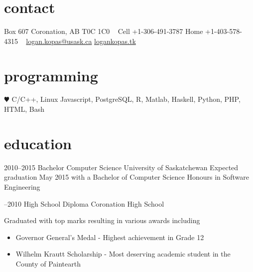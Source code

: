 \documentclass[print]{friggeri-cv} %
\begin{document}

\begin{aside}
\section{contact}
Box 607
Coronation, AB 
T0C 1C0
~
Cell
+1-306-491-3787
Home
+1-403-578-4315
~
\href{mailto:logan.kopas@usask.ca}{logan.kopas@usask.ca}
\href{http://www.logankopas.tk}{logankopas.tk}
\section{programming}
{\color{red} $\varheartsuit$} C/C++, Linux
Javascript, PostgreSQL, R, 
Matlab, Haskell, Python, PHP, 
HTML, Bash
\end{aside}

\section{education}
\begin{entrylist}
\entry
{2010--2015}
{Bachelor {\normalfont Computer Science}}
{University of Saskatchewan}
{Expected graduation May 2015 with a Bachelor of Computer Science Honours in Software Engineering}

\entry
{\hspace{2em} --2010}
{High School Diploma}
{Coronation High School}
{Graduated with top marks resulting in various awards including
\begin{itemize}
\item Governor General's Medal - Highest achievement in Grade 12
\item Wilhelm Krautt Scholarship - Most deserving academic student in the County of Paintearth
\end{itemize}}
\end{entrylist}

\end{document}
